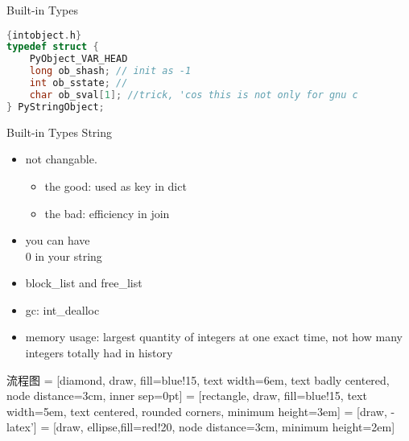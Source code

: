 \documentclass[xcolor=svgnames]{beamer}
\begin{document}
\begin{frame}[fragile]{Built-in Types}
\begin{lstlisting}[language=C]{intobject.h}
typedef struct {
    PyObject_VAR_HEAD
    long ob_shash; // init as -1
    int ob_sstate; //
    char ob_sval[1]; //trick, 'cos this is not only for gnu c
} PyStringObject;
\end{lstlisting} 
\end{frame}

\begin{frame}{Built-in Types}
String
\begin{itemize} 
  \item not changable.
      \begin{itemize}
        \item the good: used as key in dict
        \item the bad: efficiency in join
      \end{itemize}
  \pause
  \item you can have \\0 in your string 
  \pause 
  \item block\_list and free\_list
  \pause 
  \item gc: int\_dealloc
  \pause
  \item memory usage: largest quantity of integers at one exact time, not how
      many integers totally had in history
    \end{itemize} 
\end{frame}

\begin{frame}{流程图}
 = [diamond, draw, fill=blue!15, 
    text width=6em, text badly centered, node distance=3cm, inner sep=0pt]
 = [rectangle, draw, fill=blue!15, 
    text width=5em, text centered, rounded corners, minimum height=3em]
 = [draw, -latex']
 = [draw, ellipse,fill=red!20, node distance=3cm,
    minimum height=2em]
    
\end{frame}
\end{document}
